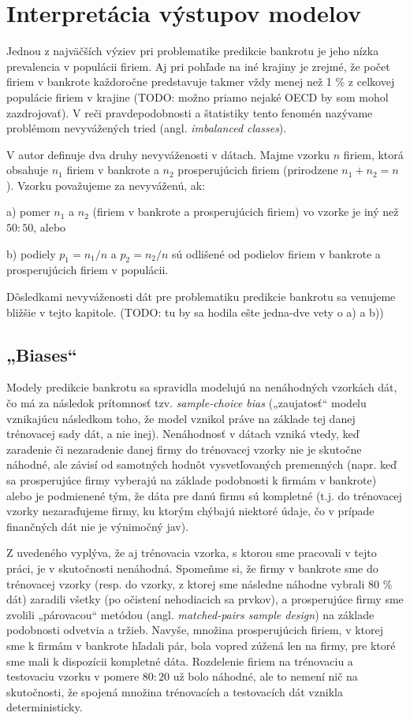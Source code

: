 \section{Interpretácia výstupov modelov}

Jednou z najväčších výziev pri problematike predikcie bankrotu je jeho nízka prevalencia v populácii firiem.
Aj pri pohľade na iné krajiny je zrejmé, že počet firiem v bankrote každoročne predstavuje takmer vždy menej než 1 \% z celkovej populácie
firiem v krajine \cite{gruszczynski} (TODO: možno priamo nejaké OECD by som mohol zazdrojovať).
V reči pravdepodobnosti a štatistiky tento fenomén nazývame problémom nevyvážených tried (angl. \emph{imbalanced classes}).

V \cite{gruszczynski} autor definuje dva druhy nevyváženosti v dátach.
Majme vzorku \(n\) firiem, ktorá obsahuje \(n_1\) firiem v bankrote a \(n_2\) prosperujúcich firiem (prirodzene \(n_1 + n_2 = n\)).
Vzorku považujeme za nevyváženú, ak:

\bigskip
a) pomer \(n_1\) a \(n_2\) (firiem v bankrote a prosperujúcich firiem) vo vzorke je iný než \(50:50\), alebo

b) podiely \(p_1 = n_1/n\) a \(p_2 = n_2/n\) sú odlišené od podielov firiem v bankrote a prosperujúcich firiem v populácii.
\bigskip

Dôsledkami nevyváženosti dát pre problematiku predikcie bankrotu sa venujeme bližšie v tejto kapitole. (TODO: tu by sa hodila ešte jedna-dve vety o a) a b))

\subsection{„Biases“}

Modely predikcie bankrotu sa spravidla modelujú na nenáhodných vzorkách dát, čo má za následok  prítomnosť tzv. \emph{sample-choice bias}
(„zaujatosť“ modelu vznikajúcu následkom toho, že model vznikol práve na základe tej danej trénovacej sady dát, a nie inej).
Nenáhodnosť v dátach vzniká vtedy, keď zaradenie či nezaradenie danej firmy do trénovacej vzorky nie je skutočne náhodné, ale závisí od samotných hodnôt vysvetľovaných premenných
(napr. keď sa prosperujúce firmy vyberajú na základe podobnosti k firmám v bankrote) alebo je podmienené tým, že dáta pre danú firmu sú kompletné
(t.j. do trénovacej vzorky nezaraďujeme firmy, ku ktorým chýbajú niektoré údaje, čo v prípade finančných dát nie je výnimočný jav).

Z uvedeného vyplýva, že aj trénovacia vzorka, s ktorou sme pracovali v tejto práci, je v skutočnosti nenáhodná.
Spomeňme si, že firmy v bankrote sme do trénovacej vzorky (resp. do vzorky, z ktorej sme následne náhodne vybrali 80 \% dát) zaradili všetky (po očistení nehodiacich sa prvkov),
a prosperujúce firmy sme zvolili „párovacou“ metódou (angl. \emph{matched-pairs sample design}) na základe podobnosti odvetvia a tržieb.
Navyše, množina prosperujúcich firiem, v ktorej sme k firmám v bankrote hľadali pár, bola vopred zúžená len na firmy, pre ktoré sme mali k dispozícii kompletné dáta.
Rozdelenie firiem na trénovaciu a testovaciu vzorku v pomere \(80:20\) už bolo náhodné, ale to nemení nič na skutočnosti, že spojená množina trénovacích a testovacích dát vznikla deterministicky.

